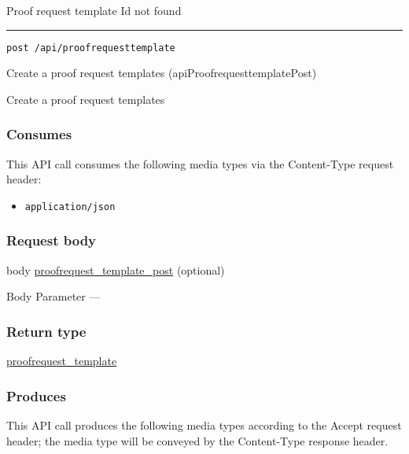 Proof request template Id not found \protect\hyperlink{}{}

\begin{center}\rule{0.5\linewidth}{\linethickness}\end{center}

\protect\hypertarget{apiProofrequesttemplatePost}{}{}

\begin{verbatim}
post /api/proofrequesttemplate
\end{verbatim}

Create a proof request templates ({apiProofrequesttemplatePost})

Create a proof request templates

\hypertarget{consumes-55}{%
\subsubsection{Consumes}\label{consumes-55}}

This API call consumes the following media types via the {Content-Type}
request header:

\begin{itemize}
\tightlist
\item
  \texttt{application/json}
\end{itemize}

\hypertarget{request-body-55}{%
\subsubsection{Request body}\label{request-body-55}}

body
\protect\hyperlink{proofrequest_template_post}{proofrequest\_template\_post}
(optional)

{Body Parameter} ---

\hypertarget{return-type-134}{%
\subsubsection{Return type}\label{return-type-134}}

\protect\hyperlink{proofrequest_template}{proofrequest\_template}

\hypertarget{produces-171}{%
\subsubsection{Produces}\label{produces-171}}

This API call produces the following media types according to the
{Accept} request header; the media type will be conveyed by the
{Content-Type} response header.

